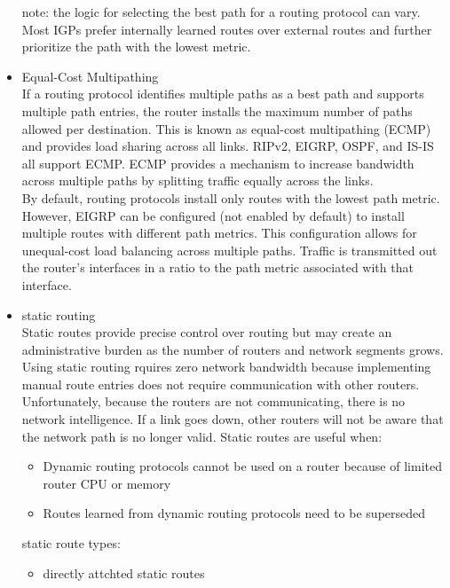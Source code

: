 \documentclass{article}
\begin{document}
\begin{itemize}
	note: the logic for selecting the best path for a routing protocol can vary. Most IGPs prefer internally learned routes over external routes and further prioritize the path with the lowest metric.\\

\item{Equal-Cost Multipathing}\\

	If a routing protocol identifies multiple paths as a best path and supports multiple path entries, the router installs the maximum number of paths allowed per destination. This is known as equal-cost multipathing (ECMP) and provides load sharing across all links. RIPv2, EIGRP, OSPF, and IS-IS all support ECMP. ECMP provides a mechanism to increase bandwidth across multiple paths by splitting traffic equally across the links.\\

		By default, routing protocols install only routes with the lowest path metric. However, EIGRP can be configured (not enabled by default) to install multiple routes with different path metrics. This configuration allows for unequal-cost load balancing across multiple paths. Traffic is transmitted out the router's interfaces in a ratio to the path metric associated with that interface.

\item{static routing}\\

	Static routes provide precise control over routing but may create an administrative burden as the number of routers and network segments grows. Using static routing rquires zero network bandwidth because implementing manual route entries does not require communication with other routers.\\

	Unfortunately, because the routers are not communicating, there is no network intelligence. If a link goes down, other routers will not be aware that the network path is no longer valid. Static routes are useful when:

	\begin{itemize}
	\item Dynamic routing protocols cannot be used on a router because of limited router CPU or memory
	\item Routes learned from dynamic routing protocols need to be superseded
	\end{itemize}

	static route types:
	\begin{itemize}
	\item{directly attchted static routes}


\end{itemize}
\end{itemize}
\end{document}

